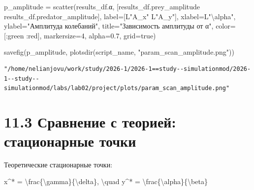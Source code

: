 \documentclass[
  12pt,
  a4paper,
  DIV=11,
  numbers=noendperiod]{scrreprt}
\newenvironment{Shaded}{\begin{snugshade}}{\end{snugshade}}
\newcommand{\ConstantTok}[1]{\textcolor[rgb]{0.56,0.35,0.01}{#1}}
\newcommand{\FloatTok}[1]{\textcolor[rgb]{0.68,0.00,0.00}{#1}}
\newcommand{\FunctionTok}[1]{\textcolor[rgb]{0.28,0.35,0.67}{#1}}
\newcommand{\NormalTok}[1]{\textcolor[rgb]{0.00,0.23,0.31}{#1}}
\newcommand{\OperatorTok}[1]{\textcolor[rgb]{0.37,0.37,0.37}{#1}}
\newcommand{\SpecialCharTok}[1]{\textcolor[rgb]{0.37,0.37,0.37}{#1}}
\newcommand{\StringTok}[1]{\textcolor[rgb]{0.13,0.47,0.30}{#1}}
\begin{document}
\begin{Shaded}
\begin{Highlighting}[]
\NormalTok{p\_amplitude }\OperatorTok{=} \FunctionTok{scatter}\NormalTok{(results\_df.α, [results\_df.prey\_amplitude results\_df.predator\_amplitude],}
\NormalTok{    label}\OperatorTok{=}\NormalTok{[L}\StringTok{"A\_x"}\NormalTok{ L}\StringTok{"A\_y"}\NormalTok{],}
\NormalTok{    xlabel}\OperatorTok{=}\NormalTok{L}\StringTok{"}\SpecialCharTok{\textbackslash{}a}\StringTok{lpha"}\NormalTok{,}
\NormalTok{    ylabel}\OperatorTok{=}\StringTok{"Амплитуда колебаний"}\NormalTok{,}
\NormalTok{    title}\OperatorTok{=}\StringTok{"Зависимость амплитуды от α"}\NormalTok{,}
\NormalTok{    color}\OperatorTok{=}\NormalTok{[}\OperatorTok{:}\NormalTok{green }\OperatorTok{:}\NormalTok{red],}
\NormalTok{    markersize}\OperatorTok{=}\FloatTok{4}\NormalTok{,}
\NormalTok{    alpha}\OperatorTok{=}\FloatTok{0.7}\NormalTok{,}
\NormalTok{    grid}\OperatorTok{=}\ConstantTok{true}\NormalTok{)}

\FunctionTok{savefig}\NormalTok{(p\_amplitude, }\FunctionTok{plotsdir}\NormalTok{(script\_name, }\StringTok{"param\_scan\_amplitude.png"}\NormalTok{))}
\end{Highlighting}
\end{Shaded}

\begin{verbatim}
"/home/nelianjovu/work/study/2026-1/2026-1==study--simulationmod/2026-1--study--simulationmod/labs/lab02/project/plots/param_scan_amplitude.png"
\end{verbatim}

\section{11.3 Сравнение с теорией: стационарные
точки}\label{ux441ux440ux430ux432ux43dux435ux43dux438ux435-ux441-ux442ux435ux43eux440ux438ux435ux439-ux441ux442ux430ux446ux438ux43eux43dux430ux440ux43dux44bux435-ux442ux43eux447ux43aux438}

Теоретические стационарные точки:

\begin{Shaded}
\begin{Highlighting}[]
\NormalTok{x\^{}* = \textbackslash{}frac\{\textbackslash{}gamma\}\{\textbackslash{}delta\}, \textbackslash{}quad y\^{}* = \textbackslash{}frac\{\textbackslash{}alpha\}\{\textbackslash{}beta\}}
\end{Highlighting}
\end{Shaded}
\end{document}
